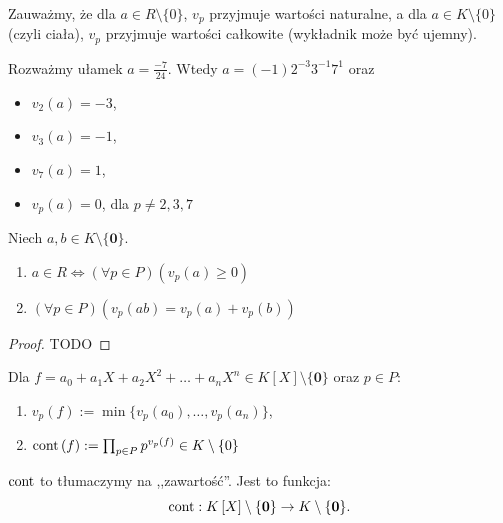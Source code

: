 \noindent Zauważmy, że dla $a \in R\setminus \{0\} $, $v_{p}$ przyjmuje wartości naturalne, a dla $a \in K\setminus \{0\} $ (czyli ciała), $v_{p}$ przyjmuje wartości całkowite (wykładnik może być ujemny).

\begin{eg}
	Rozważmy ułamek $a = \frac{-7}{24}$. Wtedy $a = \left( -1 \right) 2^{-3}3^{-1}7^{1}$ oraz
	\begin{itemize}
		\item $v_{2}\left( a \right) = -3$,
		\item $v_{3}\left( a \right) = -1$,
		\item $v_{7}\left( a \right) = 1$,
		\item $v_{p}\left( a \right) = 0$, dla $p \neq 2,3,7$
	\end{itemize}
\end{eg} 
\begin{lemma}
	Niech $a,b \in K\setminus \{\mathbf{0}\} $.
	\begin{enumerate}[label=\arabic*)]
		\item $a\in R \iff \left(\forall p \in P \right)\left( v_{p}(a) \ge 0 \right)  $ 
		\item $\left(\forall p \in P \right)\left( v_{p}\left( ab \right) = v_{p}(a) + v_{p}(b) \right)  $
	\end{enumerate}
\end{lemma} 
\begin{proof}
	TODO
\end{proof} 
\begin{definition}
	Dla $f = a_0 + a_1X + a_2X^2 + \ldots + a_{n} X^{n} \in K\left[ X \right] \setminus \{\mathbf{0}\} $ oraz $p \in P$:
	\begin{enumerate}[label=\arabic*)]
		\item $v_{p}\left( f \right) := \min \{v_{p}\left( a_0 \right) , \ldots, v_{p}\left( a_{n}  \right) \} $,
		\item $\operatorname{cont}\left( f \right) := \prod_{p\in P} p^{v_{p}(f)} \in K\setminus \{0\}  $
	\end{enumerate}
	$\operatorname{cont}$ to tłumaczymy na ,,zawartość''. Jest to funkcja:
	\[
	\operatorname{cont}: K\left[ X \right] \setminus \{\mathbf{0}\} \to K\setminus \{\mathbf{0}\} 
	.\] 
\end{definition} 
